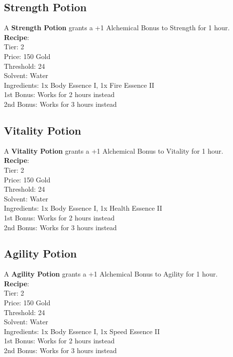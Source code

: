 \subsection{Strength Potion}\label{potion:strengthPotion}
A \textbf{Strength Potion} grants a +1 Alchemical Bonus to Strength for 1 hour.\\
\textbf{Recipe}:\\
Tier: 2\\
Price: 150 Gold\\
Threshold: 24\\
Solvent: Water\\
Ingredients: 1x Body Essence I, 1x Fire Essence II\\
1st Bonus: Works for 2 hours instead\\
2nd Bonus: Works for 3 hours instead\\

\subsection{Vitality Potion}\label{potion:vitalityPotion}
A \textbf{Vitality Potion} grants a +1 Alchemical Bonus to Vitality for 1 hour.\\
\textbf{Recipe}:\\
Tier: 2\\
Price: 150 Gold\\
Threshold: 24\\
Solvent: Water\\
Ingredients: 1x Body Essence I, 1x Health Essence II\\
1st Bonus: Works for 2 hours instead\\
2nd Bonus: Works for 3 hours instead\\

\subsection{Agility Potion}\label{potion:agilityPotion}
A \textbf{Agility Potion} grants a +1 Alchemical Bonus to Agility for 1 hour.\\
\textbf{Recipe}:\\
Tier: 2\\
Price: 150 Gold\\
Threshold: 24\\
Solvent: Water\\
Ingredients: 1x Body Essence I, 1x Speed Essence II\\
1st Bonus: Works for 2 hours instead\\
2nd Bonus: Works for 3 hours instead\\

